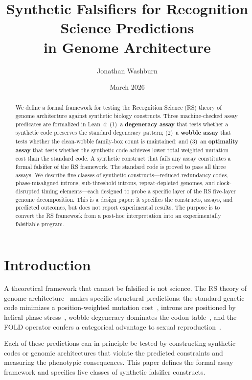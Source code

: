 \documentclass[11pt,twocolumn]{article}
\title{Synthetic Falsifiers for Recognition Science Predictions\\in Genome Architecture}
\author[1]{Jonathan Washburn}
\affil[1]{Independent Researcher}
\date{March 2026}
\begin{document}
\maketitle

\begin{abstract}
We define a formal framework for testing the Recognition Science (RS)
theory of genome architecture against synthetic biology constructs. Three
machine-checked assay predicates are formalized in Lean~4: (1)~a
\textbf{degeneracy assay} that tests whether a synthetic code preserves the
standard degeneracy pattern; (2)~a \textbf{wobble assay} that tests whether
the clean-wobble family-box count is maintained; and (3)~an
\textbf{optimality assay} that tests whether the synthetic code achieves
lower total weighted mutation cost than the standard code. A synthetic
construct that fails any assay constitutes a formal falsifier of the RS
framework. The standard code is proved to pass all three assays. We
describe five classes of synthetic constructs---reduced-redundancy codes,
phase-misaligned introns, sub-threshold introns, repeat-depleted genomes,
and clock-disrupted timing elements---each designed to probe a specific
layer of the RS five-layer genome decomposition. This is a design paper:
it specifies the constructs, assays, and predicted outcomes, but does not
report experimental results. The purpose is to convert the RS framework
from a post-hoc interpretation into an experimentally falsifiable program.
\end{abstract}

\section{Introduction}

A theoretical framework that cannot be falsified is not science. The RS
theory of genome architecture~\cite{Washburn2025, Paper4} makes specific
structural predictions: the standard genetic code minimizes a
position-weighted mutation cost~\cite{Paper2}, introns are positioned by
helical phase stress~\cite{Paper7}, wobble degeneracy dominates the codon
table~\cite{Paper3}, and the FOLD operator confers a categorical advantage
to sexual reproduction~\cite{Paper6}.

Each of these predictions can in principle be tested by constructing
synthetic codes or genomic architectures that violate the predicted
constraints and measuring the phenotypic consequences. This paper defines
the formal assay framework and specifies five classes of synthetic
falsifier constructs.
\end{document}
